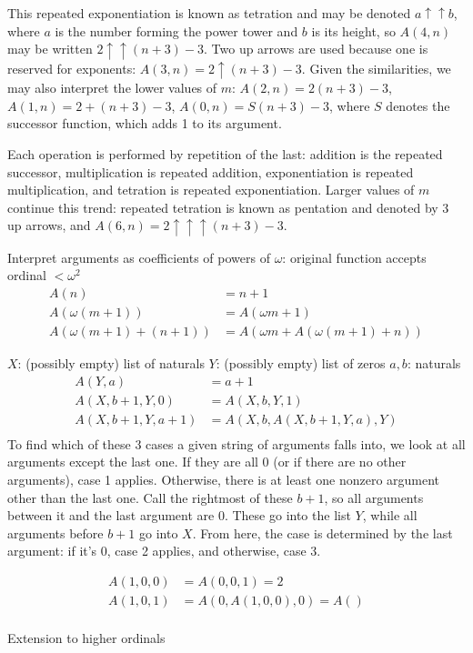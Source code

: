 \documentclass{article}
\begin{document}
This repeated exponentiation is known as tetration
and may be denoted $a \uparrow \uparrow b$,
where $a$ is the number forming the power tower
and $b$ is its height,
so $A(4, n)$ may be written $2\uparrow\uparrow(n+3)-3$.
Two up arrows are used because one is reserved for exponents:
$A(3, n) = 2\uparrow(n+3)-3$.
Given the similarities,
we may also interpret the lower values of $m$:
$A(2, n) = 2(n+3)-3$, $A(1, n) = 2+(n+3)-3$, $A(0, n) = S(n+3)-3$,
where $S$ denotes the successor function,
which adds 1 to its argument.

Each operation is performed by repetition of the last:
addition is the repeated successor,
multiplication is repeated addition,
exponentiation is repeated multiplication,
and tetration is repeated exponentiation.
Larger values of $m$ continue this trend:
repeated tetration is known as pentation and denoted by 3 up arrows,
and $A(6, n) = 2\uparrow\uparrow\uparrow(n+3)-3$.

Interpret arguments as coefficients of powers of $\omega$:
original function accepts ordinal $<\omega^2$
\begin{align*}
  A(n) &= n+1 \\
  A(\omega(m+1)) &= A(\omega m+1) \\
  A(\omega(m+1)+(n+1)) &= A(\omega m+A(\omega(m+1)+n))
\end{align*}

$X$: (possibly empty) list of naturals
$Y$: (possibly empty) list of zeros
$a, b$: naturals
\begin{align*}
  A(Y, a) &= a+1 \\
  A(X, b+1, Y, 0) &= A(X, b, Y, 1) \\
  A(X, b+1, Y, a+1) &= A(X, b, A(X, b+1, Y, a), Y) \\
\end{align*}
To find which of these 3 cases a given string of arguments falls into,
we look at all arguments except the last one.
If they are all 0 (or if there are no other arguments), case 1 applies.
Otherwise, there is at least one nonzero argument other than the last one.
Call the rightmost of these $b+1$,
so all arguments between it and the last argument are 0.
These go into the list $Y$,
while all arguments before $b+1$ go into $X$.
From here, the case is determined by the last argument:
if it's 0, case 2 applies,
and otherwise, case 3.

\begin{align*}
  A(1, 0, 0) &= A(0, 0, 1) = 2 \\
  A(1, 0, 1) &= A(0, A(1, 0, 0), 0) = A() \\
\end{align*}

Extension to higher ordinals

\end{document}

